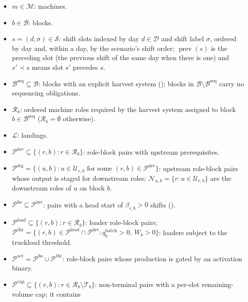 \begin{itemize}
\tightlist
\item
  \(m \in \mathcal{M}\): machines.
\item
  \(b \in \mathcal{B}\): blocks.
\item
  \(s=(d,\sigma) \in \mathcal{S}\): shift slots indexed by day
  \(d \in \mathcal{D}\) and shift label \(\sigma\), ordered by day and,
  within a day, by the scenario's shift order;
  \(\operatorname{prev}(s)\) is the preceding slot (the previous shift
  of the same day when there is one) and \(s'\prec s\) means slot \(s'\)
  precedes \(s\).
\item
  \(\mathcal{B}^{\text{seq}} \subseteq \mathcal{B}\): blocks with an
  explicit harvest system (); blocks in
  \(\mathcal{B}\setminus\mathcal{B}^{\text{seq}}\) carry no sequencing
  obligations.
\item
  \(\mathcal{R}_b\): ordered machine roles required by the harvest
  system assigned to block \(b\in\mathcal{B}^{\text{seq}}\)
  (\(\mathcal{R}_b=\emptyset\) otherwise).
\item
  \(\mathcal{L}\): landings.
\item
  \(\mathcal{P}^{\text{inv}} \subseteq \{(r,b): r \in \mathcal{R}_b\}\):
  role-block pairs with upstream prerequisites.
\item
  \(\mathcal{P}^{\text{stg}} = \{(u,b): u \in \mathcal{U}_{r,b} \text{ for some } (r,b)\in\mathcal{P}^{\text{inv}}\}\):
  upstream role-block pairs whose output is staged for downstream roles;
  \(\mathcal{N}_{u,b} = \{r: u\in\mathcal{U}_{r,b}\}\) are the
  downstream roles of \(u\) on block \(b\).
\item
  \(\mathcal{P}^{\text{hs}} \subseteq \mathcal{P}^{\text{inv}}\): pairs
  with a head start of \(\beta_{r,b}>0\) shifts
  ().
\item
  \(\mathcal{P}^{\text{load}} \subseteq \{(r,b): r \in \mathcal{R}_b\}\):
  loader role-block pairs;
  \(\mathcal{P}^{\text{thr}} = \{(r,b)\in\mathcal{P}^{\text{load}}\cap\mathcal{P}^{\text{inv}}: q^{\text{batch}}_{b}>0,\ W_b>0\}\):
  loaders subject to the truckload threshold.
\item
  \(\mathcal{P}^{\text{act}} = \mathcal{P}^{\text{hs}} \cup \mathcal{P}^{\text{thr}}\):
  role-block pairs whose production is gated by an activation binary.
\item
  \(\mathcal{P}^{\text{cap}} \subseteq \{(r,b): r \in \mathcal{R}_b\setminus\mathcal{T}_b\}\):
  non-terminal pairs with a per-slot remaining-volume cap; it contains

\end{itemize}
